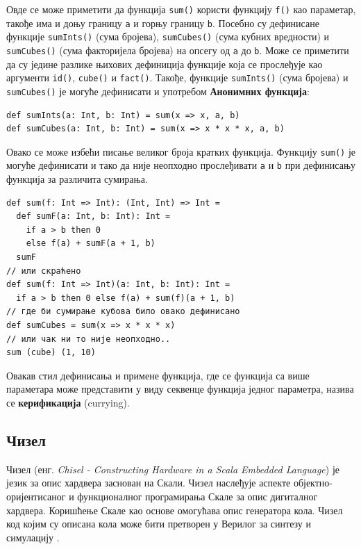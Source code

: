 \documentclass[12pt, a4paper]{article}
\theoremstyle{definition}
\begin{document}
Овде се може приметити да функција \verb+sum()+ користи функцију \verb+f()+  као параметар, такође има и доњу границу \verb+a+ и горњу границу \verb+b+. Посебно су дефинисане функције \verb+sumInts()+ (сума бројева), \verb+sumCubes()+ (сума кубних вредности) и \verb+sumCubes()+ (сума факторијела бројева) на опсегу од \verb+a+ до \verb+b+. Може се приметити да су једине разлике њихових дефиниција функције која се прослеђује као аргументи \verb+id()+, \verb+cube()+ и \verb+fact()+.
Такође, функције \verb+sumInts()+ (сума бројева) и \verb+sumCubes()+ је могуће дефинисати и употребом \textbf{Анонимних функција}:
\begin{verbatim}
def sumInts(a: Int, b: Int) = sum(x => x, a, b)
def sumCubes(a: Int, b: Int) = sum(x => x * x * x, a, b)
\end{verbatim}
Овако се може избећи писање великог броја кратких функција. Функцију \verb+sum()+ је могуће дефинисати и тако да није неопходно прослеђивати \verb+a+ и \verb+b+ при дефинисању функција за различита сумирања.
\begin{verbatim}
def sum(f: Int => Int): (Int, Int) => Int =
  def sumF(a: Int, b: Int): Int =
    if a > b then 0
    else f(a) + sumF(a + 1, b)
  sumF
// или скраћено
def sum(f: Int => Int)(a: Int, b: Int): Int =
  if a > b then 0 else f(a) + sum(f)(a + 1, b)
// где би сумирање кубова било овако дефинисано
def sumCubes = sum(x => x * x * x)
// или чак ни то није неопходно..
sum (cube) (1, 10)
\end{verbatim}
Овакав стил дефинисања и примене функција, где се функција са више параметара може представити у виду секвенце функција једног параметра, назива се \textbf{керификација} (currying).


\subsection{Чизел}
Чизел (енг. \textit{Chisel - Constructing Hardware in a Scala Embedded Language}) је језик за опис хардвера заснован на Скали. Чизел наслеђује аспекте објектно-оријентисаног и функционалног програмирања Скале за опис дигиталног хардвера. Коришћење Скале као основе омогућава опис генератора кола. Чизел код којим су описана кола може бити претворен у Верилог за синтезу и симулацију \cite{wiki_chisel}.
\end{document}
